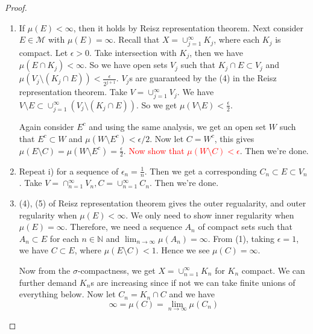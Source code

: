 \begin{proof}
  \begin{enumerate}
    \item If $\mu(E) < \infty$, then it holds by Reisz representation theorem.
      Next consider $E \in \mathcal{M}$ with $\mu(E) = \infty$. Recall
      that $X = \cup_{j = 1}^{\infty}K_j$, where each $K_j$ is compact.
      Let $\epsilon > 0$. Take intersection with $K_j$, then we have
      $\mu(E \cap K_j) < \infty$. So we have open sets $V_j$ such that
      $K_j \cap E \subset V_j$ and $\mu(V_j\setminus (K_j \cap E)) <
      \frac{\epsilon}{2^{j+1}}$. $V_j$s are guaranteed by the (4) in
      the Reisz representation theorem.
      Take $V = \cup_{ j = 1}^{\infty}V_j$. We have $V\setminus E
      \subset \cup_{j = 1}^{\infty}(V_j \setminus (K_j \cap E))$. So we
      get $\mu(V\setminus E) < \frac{\epsilon}{2}$.

      Again consider $ E^{c}$ and using the same analysis, we get an
      open set $W$ such that $E^c \subset W$ and $\mu(W\setminus E^{c})
      < \epsilon/2$. Now let $C = W^c$, this gives $\mu(E\setminus C) =
      \mu(W\setminus E^c) = \frac{\epsilon}{2}$.
      \textcolor{red}{Now show that $\mu(W\setminus C) < \epsilon$}.
      Then we're done.

  \item Repeat i) for a sequence of $\epsilon_n = \frac{1}{n}$. Then we
    get a corresponding $C_n \subset E \subset V_n$. Take $V = \cap_{n
    = 1}^{\infty}V_n, C = \cup_{n = 1}^{\infty} C_n$. Then we're done.

  \item (4), (5) of Reisz representation theorem gives the outer
    regualarity, and outer regularity when $\mu(E) < \infty$. We only
    need to show inner regularity when $\mu(E) = \infty$. Therefore, we
    need a sequence $A_n$ of compact sets such that $A_n \subset E$ for
    each $n \in \mathbb{N}$ and $\lim_{n \to \infty} \mu(A_n) = \infty$.
    From (1), taking $\epsilon = 1$, we have $C \subset E$, where
    $\mu(E \setminus C) < 1$. Hence we see $\mu(C) = \infty$.

    Now from the $\sigma$-compactness, we get $X = \cup_{n =
    1}^{\infty}K_n$ for $K_n$ compact. We can further demand $K_n$s are
    increasing since if not we can take finite unions of everything
    below. Now let $C_n = K_n \cap C$ and we have \[
      \infty = \mu(C) = \lim_{n \to \infty} \mu(C_n)
    \]
\end{enumerate}
\end{proof}

